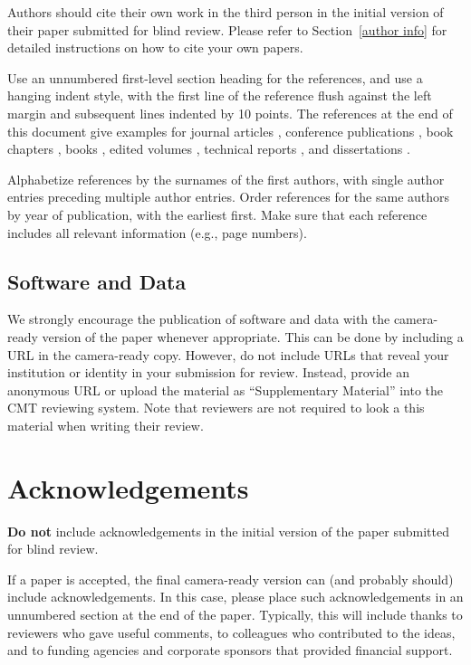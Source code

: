 \documentclass{article}
\begin{document}
Authors should cite their own work in the third person
in the initial version of their paper submitted for blind review.
Please refer to Section~\ref{author info} for detailed instructions on how to
cite your own papers.

Use an unnumbered first-level section heading for the references, and 
use a hanging indent style, with the first line of the reference flush
against the left margin and subsequent lines indented by 10 points. 
The references at the end of this document give examples for journal
articles \cite{Samuel59}, conference publications \cite{langley00}, book chapters \cite{Newell81}, books \cite{DudaHart2nd}, edited volumes \cite{MachineLearningI}, 
technical reports \cite{mitchell80}, and dissertations \cite{kearns89}. 

Alphabetize references by the surnames of the first authors, with
single author entries preceding multiple author entries. Order
references for the same authors by year of publication, with the
earliest first. Make sure that each reference includes all relevant
information (e.g., page numbers).

\subsection{Software and Data}

We strongly encourage the publication of software and data with the
camera-ready version of the paper whenever appropriate.  This can be
done by including a URL in the camera-ready copy.  However, do not
include URLs that reveal your institution or identity in your
submission for review.  Instead, provide an anonymous URL or upload
the material as ``Supplementary Material'' into the CMT reviewing
system.  Note that reviewers are not required to look a this material
when writing their review.

\section*{Acknowledgements} 
 
\textbf{Do not} include acknowledgements in the initial version of
the paper submitted for blind review.

If a paper is accepted, the final camera-ready version can (and
probably should) include acknowledgements. In this case, please
place such acknowledgements in an unnumbered section at the
end of the paper. Typically, this will include thanks to reviewers
who gave useful comments, to colleagues who contributed to the ideas, 
and to funding agencies and corporate sponsors that provided financial 
support.  


\nocite{langley00}



\end{document}
